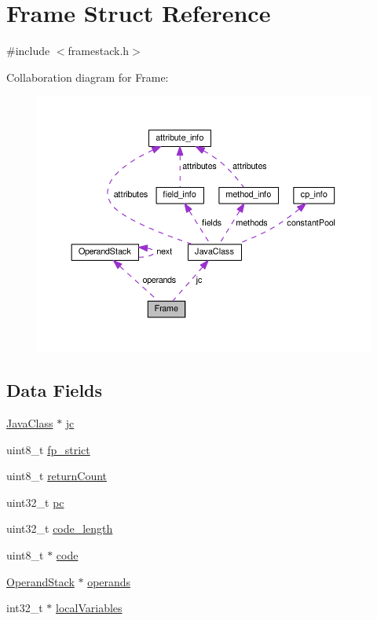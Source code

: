 \hypertarget{structFrame}{}\section{Frame Struct Reference}
\label{structFrame}


{\ttfamily \#include $<$framestack.\+h$>$}



Collaboration diagram for Frame\+:\nopagebreak
\begin{figure}[H]
\begin{center}
\leavevmode
\includegraphics[width=350pt]{structFrame__coll__graph}
\end{center}
\end{figure}
\subsection*{Data Fields}
\begin{DoxyCompactItemize}
\item 
\hyperlink{structJavaClass}{Java\+Class} $\ast$ \hyperlink{structFrame_a6a053c391bc6b65491e72d2fc8ef360f}{jc}
\item 
uint8\+\_\+t \hyperlink{structFrame_ab031c9459d085013efbd0bd3b6a6da34}{fp\+\_\+strict}
\item 
uint8\+\_\+t \hyperlink{structFrame_aa5732143b7e6cc091fc23a3222364ed0}{return\+Count}
\item 
uint32\+\_\+t \hyperlink{structFrame_a91e50d2091184efb52b6d7c0c21fd4b2}{pc}
\item 
uint32\+\_\+t \hyperlink{structFrame_a33a0dd3a739e1dcfd8b03621c752bb28}{code\+\_\+length}
\item 
uint8\+\_\+t $\ast$ \hyperlink{structFrame_a9de8be272246d00c7a0c2ddc899fe8f2}{code}
\item 
\hyperlink{structOperandStack}{Operand\+Stack} $\ast$ \hyperlink{structFrame_a0be587b8515083ff6d3c4e55918a7657}{operands}
\item 
int32\+\_\+t $\ast$ \hyperlink{structFrame_a9047c9524d44fc81cb6311de8a2a8b77}{local\+Variables}
\end{DoxyCompactItemize}


